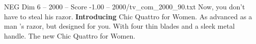 \begin{textsample}{NEG Dim 6 – 2000 – Score -1.00 – 2000/tv\_com\_2000\_90.txt}  \label{ex:f6_neg_007}
Now, you don't have to steal his razor. \textbf{Introducing} Chic Quattro for Women.
As advanced as a man 's razor, but designed for you.
With four thin blades and a sleek metal handle.
The new Chic Quattro for Women.

\end{textsample}
